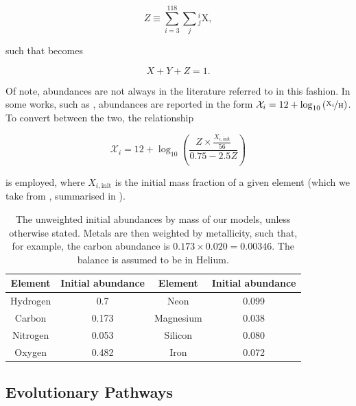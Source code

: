 \begin{equation}
    Z \equiv \sum_{i=3}^{118} \sum_{j} {}^{i}_{j}\text{X},
\end{equation}

such that  becomes

\begin{equation}
    X+Y+Z = 1.
\end{equation}

Of note, abundances are not always in the literature referred to in this fashion. In some works, such as \citet{Asplund:2021}, abundances are reported in the form $\mathcal{X}_i=12+\log_{10}\left(\nicefrac{\text{X}_i}{\text{H}}\right)$. To convert between the two, the relationship

\begin{equation}
    \mathcal{X}_i = 12+\log_{10}\left(\frac{Z\times \frac{X_{i, \text{init}}}{56}}{0.75-2.5Z}\right)
\end{equation}

is employed, where $X_{i,\text{init}}$ is the initial mass fraction of a given element (which we take from \citealt{Grevesse:1993}, summarised in ).

\begin{table}[!htbp]
    \centering
    \begin{tabular}{cc|cc}
        \toprule
        Element & Initial abundance & Element & Initial abundance \\
        \midrule
        Hydrogen & 0.7   & Neon      & 0.099 \\
        Carbon   & 0.173 & Magnesium & 0.038 \\
        Nitrogen & 0.053 & Silicon   & 0.080 \\
        Oxygen   & 0.482 & Iron      & 0.072 \\
        \hline

        \hline
    \end{tabular}
    \caption[The unweighted initial abundances by mass of our models, unless otherwise stated.]{The unweighted initial abundances by mass of our models, unless otherwise stated. Metals are then weighted by metallicity, such that, for example, the carbon abundance is $0.173\times0.020=0.00346$. The balance is assumed to be in Helium.}
    \label{tab:initial_abundances}
\end{table}

\subsection{Evolutionary Pathways}

